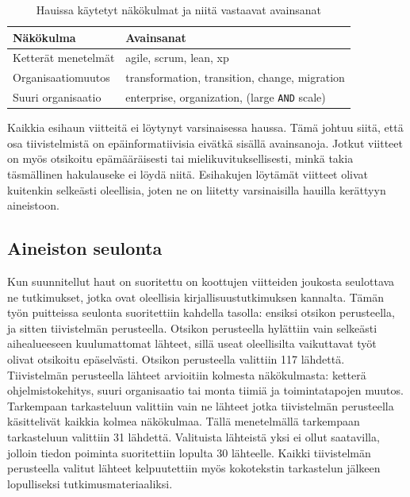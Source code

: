 \begin{table}[h]
    \begin{tabular}{|l|l|}
        \hline
        Näkökulma           & Avainsanat   \\ \hline
        Ketterät menetelmät & agile, scrum, lean, xp \\ 
        Organisaatiomuutos  & transformation, transition, change, migration \\
        Suuri organisaatio  & enterprise, organization, (large \texttt{AND} scale) \\
        \hline
    \end{tabular}
	\caption{Hauissa käytetyt näkökulmat ja niitä vastaavat avainsanat}
	\label{table:hakulausekkeet}
\end{table}

Kaikkia esihaun viitteitä ei löytynyt varsinaisessa haussa. Tämä johtuu siitä,
että osa tiivistelmistä on epäinformatiivisia eivätkä sisällä avainsanoja.
Jotkut viitteet on myös otsikoitu epämääräisesti tai mielikuvituksellisesti,
minkä takia täsmällinen hakulauseke ei löydä niitä. Esihakujen löytämät
viitteet olivat kuitenkin selkeästi oleellisia, joten ne on liitetty
varsinaisilla hauilla kerättyyn aineistoon.

\subsection{Aineiston seulonta}

Kun suunnitellut haut on suoritettu on koottujen viitteiden joukosta seulottava
ne tutkimukset, jotka ovat oleellisia kirjallisuustutkimuksen kannalta. Tämän
työn puitteissa seulonta suoritettiin kahdella tasolla: ensiksi otsikon
perusteella, ja sitten tiivistelmän perusteella. Otsikon perusteella hylättiin
vain selkeästi aihealueeseen kuulumattomat lähteet, sillä useat oleellisilta
vaikuttavat työt olivat otsikoitu epäselvästi. Otsikon perusteella valittiin 117
lähdettä. Tiivistelmän perusteella lähteet arvioitiin kolmesta näkökulmasta:
ketterä ohjelmistokehitys, suuri organisaatio tai monta tiimiä ja
toimintatapojen muutos. Tarkempaan tarkasteluun valittiin vain ne lähteet jotka
tiivistelmän perusteella käsittelivät kaikkia kolmea näkökulmaa. Tällä
menetelmällä tarkempaan tarkasteluun valittiin 31 lähdettä. Valituista lähteistä
yksi ei ollut saatavilla, jolloin tiedon poiminta suoritettiin lopulta 30
lähteelle. Kaikki tiivistelmän perusteella valitut lähteet kelpuutettiin
myös kokotekstin tarkastelun jälkeen lopulliseksi tutkimusmateriaaliksi.


